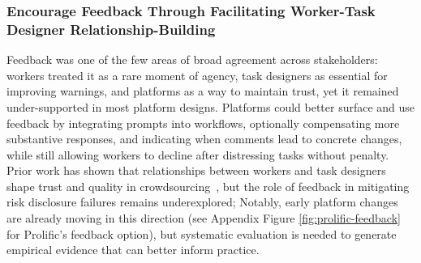 \subsubsection{Encourage Feedback Through Facilitating Worker-Task Designer Relationship-Building}
Feedback was one of the few areas of broad agreement across stakeholders: workers treated it as a rare moment of agency, task designers as essential for improving warnings, and platforms as a way to maintain trust, yet it remained under-supported in most platform designs. Platforms could better surface and use feedback by integrating prompts into workflows, optionally compensating more substantive responses, and indicating when comments lead to concrete changes, while still allowing workers to decline after distressing tasks without penalty. Prior work has shown that relationships between workers and task designers shape trust and quality in crowdsourcing~\cite{irani2013turkopticon, qian2025locating}, but the role of feedback in mitigating risk disclosure failures remains underexplored;  Notably, early platform changes are already moving in this direction (see Appendix Figure \ref{fig:prolific-feedback} for Prolific's feedback option), but systematic evaluation is needed to generate empirical evidence that can better inform practice.

